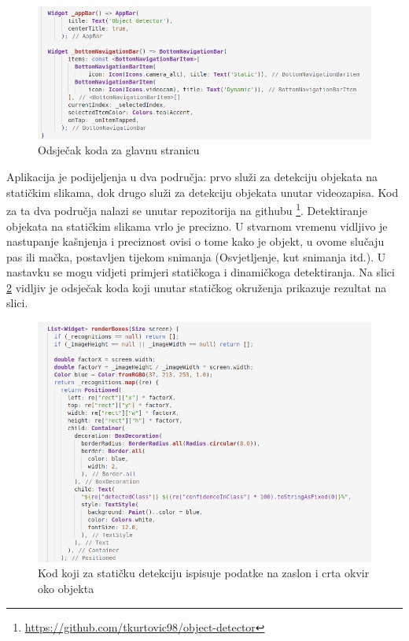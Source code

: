 \begin{figure}[htb]
    \centering
    \includegraphics[width=14cm]{img/flutter-main.png}
    \caption{Odsječak koda za glavnu stranicu}
    \label{Flutter-main}
\end{figure}

Aplikacija je podijeljenja u dva područja: prvo služi za detekciju objekata na statičkim slikama, dok drugo služi za detekciju objekata unutar videozapisa. Kod za ta dva područja nalazi se unutar repozitorija na githubu \footnote{\url{https://github.com/tkurtovic98/object-detector}}.\newline
Detektiranje objekata na statičkim slikama vrlo je precizno. U stvarnom vremenu vidljivo je nastupanje kašnjenja i preciznost ovisi o tome 
kako je objekt, u ovome slučaju pas ili mačka, postavljen tijekom snimanja (Osvjetljenje, kut snimanja itd.). U nastavku se mogu vidjeti primjeri statičkoga i dinamičkoga detektiranja. Na slici \ref{Flutter-render-boxes} vidljiv je odsječak koda koji
unutar statičkog okruženja prikazuje rezultat na slici.

\begin{figure}[htb]
    \centering
    \includegraphics[width=14cm]{img/Flutter-render-boxes.png}
    \caption{Kod koji za statičku detekciju ispisuje podatke na zaslon i crta okvir oko objekta}
    \label{Flutter-render-boxes}
\end{figure}

